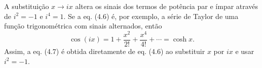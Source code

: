 A substituição $x\to ix$ altera os sinais dos termos de potência par e ímpar através de $i^2=-1$ e $i^4=1$. Se a eq. (4.6) é, por exemplo, a série de Taylor de uma função trigonométrica com sinais alternados, então
\[
\cos(ix)=1+\frac{x^{2}}{2!}+\frac{x^{4}}{4!}+\cdots=\cosh x.
\]
Assim, a eq. (4.7) é obtida diretamente de eq. (4.6) ao substituir $x$ por $ix$ e usar $i^2=-1$.